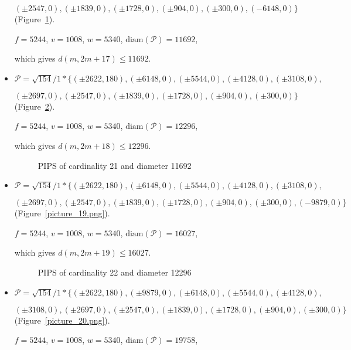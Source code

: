 \documentclass[12pt]{article}
\theoremstyle{theorem}
\theoremstyle{dfn}
\theoremstyle{remark}
\begin{document}
\begin{itemize}
$
(\pm 2547 , 0),
(\pm 1839 , 0),
(\pm 1728 , 0),
(\pm 904 , 0),
(\pm 300 , 0),
(-6148 , 0)\}
$
(Figure~\ref{picture_17.png}).

$f = 5244$, $v = 1008$, $w = 5340$, $\operatorname{diam(\mathcal{P})} = 11692$,

which gives $d(m, 2m + 17) \leq 11692$.


\item
$\mathcal{P}=\sqrt{154}/{1} * \{ (\pm 2622, 180),
(\pm 6148 , 0),
(\pm 5544 , 0),
(\pm 4128 , 0),
(\pm 3108 , 0),
$

$
(\pm 2697 , 0),
(\pm 2547 , 0),
(\pm 1839 , 0),
(\pm 1728 , 0),
(\pm 904 , 0),
(\pm 300 , 0)\}
$
(Figure~\ref{picture_18.png}).

$f = 5244$, $v = 1008$, $w = 5340$, $\operatorname{diam(\mathcal{P})} = 12296$,

which gives $d(m, 2m + 18) \leq 12296$.


\begin{figure}[h!]
\parbox{0.75\linewidth}{\caption{PIPS of cardinality 21 and diameter 11692}
\label{picture_17.png}}
\end{figure}


\item
$\mathcal{P}=\sqrt{154}/{1} * \{ (\pm 2622, 180),
(\pm 6148 , 0),
(\pm 5544 , 0),
(\pm 4128 , 0),
(\pm 3108 , 0),
$

$
(\pm 2697  , 0),
(\pm 2547 , 0),
(\pm 1839 , 0),
(\pm 1728 , 0),
(\pm 904 , 0),
(\pm 300 , 0),
(-9879 , 0)\}
$
(Figure~\ref{picture_19.png}).

$f = 5244$, $v = 1008$, $w = 5340$, $\operatorname{diam(\mathcal{P})} = 16027$,

which gives $d(m, 2m + 19) \leq 16027$.


\begin{figure}[h!]
\parbox{0.75\linewidth}{\caption{PIPS of cardinality 22 and diameter 12296}
\label{picture_18.png}}
\end{figure}


\item
$\mathcal{P}=\sqrt{154}/{1} * \{ (\pm 2622, 180),
(\pm 9879 , 0),
(\pm 6148 , 0),
(\pm 5544 , 0),
(\pm 4128 , 0),
$

$
(\pm 3108 , 0),
(\pm 2697 , 0),
(\pm 2547 , 0),
(\pm 1839 , 0),
(\pm 1728 , 0),
(\pm 904 , 0),
(\pm 300 , 0)\}
$
(Figure~\ref{picture_20.png}).

$f = 5244$, $v = 1008$, $w = 5340$, $\operatorname{diam(\mathcal{P})} = 19758$,


\end{itemize}
\end{document}
